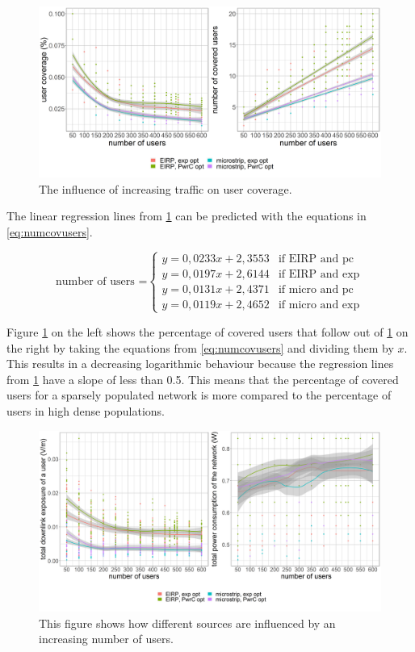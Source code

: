 \begin{figure}[h!]
  \includegraphics[width=\textwidth]{../results/s2/uvsnumdronesAndCov.png}
  \caption{The influence of increasing traffic on user coverage.}
  \label{fig:s2uvsnumcovusers}
\end{figure}

The linear regression lines from \ref{fig:s2uvsnumcovusers} can be predicted with the equations in \ref{eq:numcovusers}.

\begin{equation}
\text{number of users =}
    \begin{cases}
      y = 0,0233x + 2,3553 & \text{if EIRP and pc}\\
      y = 0,0197x + 2,6144  & \text{if EIRP and exp}\\
      y = 0,0131x + 2,4371  & \text{if micro and pc}\\
      y = 0,0119x + 2,4652  & \text{if micro and exp}
    \end{cases} 
    \label{eq:numcovusers}      
\end{equation}

Figure \ref{fig:s2uvsnumcovusers} on the left shows the percentage of covered users that follow out of \ref{fig:s2uvsnumcovusers} on the right by taking the equations 
from \ref{eq:numcovusers} and dividing them by $x$.
This results in a decreasing logarithmic behaviour because the regression lines from  \ref{fig:s2uvsnumcovusers} have a slope of less than 0.5.
This means that the percentage of covered users for a sparsely populated network is more compared to the percentage of users in high dense populations.

\begin{figure}[h!]
  \includegraphics[width=\textwidth]{../results/s2/uvsdlAndPc.png}
  \caption{This figure shows how different sources are influenced by an increasing number of users. }
  \label{fig:s2b_dlAndPc}
\end{figure}

